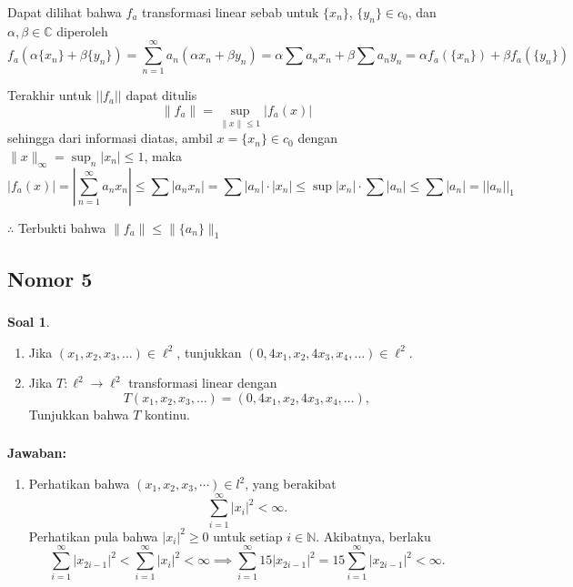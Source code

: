 \documentclass[aspectratio=169]{beamer}
\theoremstyle{definition}
\newtheorem{soal}{Soal}
\newcommand{\N}{\mathbb{N}}
\begin{document}
\begin{frame}
  \frametitle{\insertsection}
  \framesubtitle{\insertsubsection}
  Dapat dilihat bahwa $f_a$ transformasi linear sebab untuk $\{x_n\}$, $\{y_n\} \in c_0$, dan $\alpha, \beta \in \mathbb{C}$ diperoleh
$$
f_a(\alpha \{x_n\} + \beta \{y_n\}) = \sum_{n=1}^\infty a_n (\alpha x_n + \beta y_n) = \alpha \sum a_n x_n + \beta \sum a_n y_n = \alpha f_a(\{x_n\}) + \beta f_a(\{y_n\})
$$

Terakhir untuk $||f_a||$ dapat ditulis
$$
\|f_a\| = \sup_{\|x\| \leq 1} |f_a(x)|
$$
sehingga dari informasi diatas, ambil $x = \{x_n\} \in c_0$ dengan $\|x\|_\infty = \sup_n |x_n| \leq 1$, maka
$$
|f_a(x)| = \left| \sum_{n=1}^\infty a_n x_n \right| \leq \sum |a_n x_n| = \sum |a_n| \cdot |x_n| \leq \sup |x_n| \cdot \sum |a_n| \leq \sum |a_n| = ||a_n||_1
$$

$\therefore$ Terbukti bahwa $\|f_a\| \leq \|\{a_n\}\|_1
$
\end{frame}

\subsection{Nomor 5}
\begin{frame}
  \frametitle{\insertsection}
  \begin{soal}
    \begin{enumerate}
        \item Jika $(x_1, x_2, x_3, \ldots) \in \ell^2$, tunjukkan $(0, 4x_1, x_2, 4x_3, x_4, \ldots) \in \ell^2$.
        \item Jika $T \colon \ell^2 \to \ell^2$ transformasi linear dengan
        \[
        T(x_1, x_2, x_3, \ldots) = (0, 4x_1, x_2, 4x_3, x_4, \ldots),
        \]
        Tunjukkan bahwa $T$ kontinu.
      \end{enumerate}
  \end{soal}
\end{frame}

\begin{frame}
  \frametitle{\insertsection}
  \framesubtitle{\insertsubsection}
  \textbf{Jawaban:}
  \begin{enumerate}
      \item Perhatikan bahwa $(x_1,x_2,x_3,\cdots)\in l^2$, yang berakibat
    \begin{equation*}
        \sum_{i=1}^\infty|x_i|^2<\infty.
    \end{equation*}
    Perhatikan pula bahwa $|x_i|^2\geq0$ untuk setiap $i\in\N$. Akibatnya, berlaku 
    \begin{equation*}
        \sum_{i=1}^\infty|x_{2i-1}|^2<\sum_{i=1}^\infty|x_i|^2<\infty\implies\sum_{i=1}^\infty15|x_{2i-1}|^2=15\sum_{i=1}^\infty|x_{2i-1}|^2<\infty.
    \end{equation*}
    \end{enumerate}
\end{frame}
\end{document}
